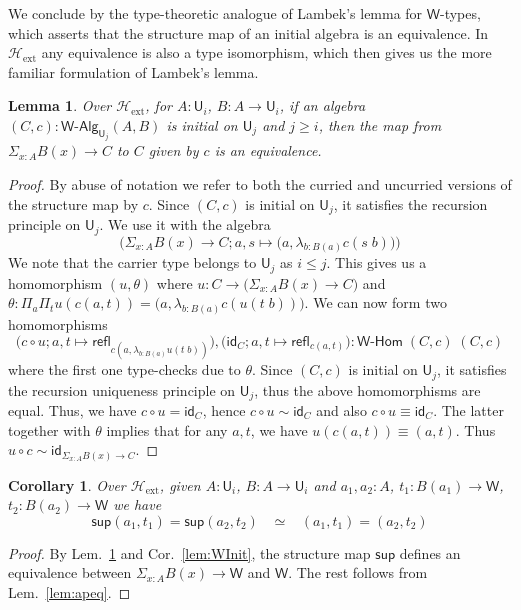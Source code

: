 \documentclass[reqno,10pt,a4paper,oneside]{amsart}
\numberwithin{equation}{section}
\theoremstyle{mythm}
\newtheorem{lemma}[theorem]{Lemma}
\newtheorem{corollary}[theorem]{Corollary}
\theoremstyle{mydef}
\theoremstyle{myrmk}
\newcommand{\idfun}[1]{\mathsf{id}_{#1}}
\newcommand{\comp}{\circ}
\newcommand{\Hext}{\mathcal{H}_{\mathrm{ext}}}
\newcommand{\prd}[1]{\Pi_{#1}}
\newcommand{\sm}[1]{\Sigma_{#1}}
\newcommand{\lam}[1]{\lambda_{#1}}
\newcommand{\refl}{\mathsf{refl}}
\newcommand{\W}{\mathsf{W}}
\newcommand{\wsup}{\mathsf{sup}}
\newcommand{\UU}{\mathsf{U}}
\newcommand{\WAlg}{\mathsf{W}\text{-}\mathsf{Alg}}
\newcommand{\WHom}{\mathsf{W}\text{-}\mathsf{Hom}}
\begin{document}
We conclude by the type-theoretic analogue of Lambek's lemma for $\W$-types, which asserts that the structure map of an initial algebra is an equivalence. In $\Hext$ any equivalence is also a type isomorphism, which then gives us the more familiar formulation of Lambek's lemma.

\begin{lemma}\label{lem:ExtLambek}
Over $\Hext$, for $A:\UU_i$, $B : A \to \UU_i$, if an algebra $(C,c) : \WAlg_{\UU_j}(A,B)$ is initial on $\UU_j$ and $j \geq i$, then the map from $\sm{x:A} B(x) \to C$ to $C$ given by $c$ is an equivalence.
\end{lemma}
\begin{proof}
By abuse of notation we refer to both the curried and uncurried versions of the structure map by $c$. Since $(C,c)$ is initial on $\UU_j$, it satisfies the recursion principle on $\UU_j$. We use it with the algebra \[\Big(\sm{x:A} B(x) \to C; a,s \mapsto \big(a,\lam{b:B(a)} c(s\;b)\big)\Big)\]
We note that the carrier type belongs to $\UU_j$ as $i \leq j$. This gives us a homomorphism $(u,\theta)$ where $u : C \to \big(\sm{x:A} B(x) \to C\big)$ and $\theta : \prd{a}\prd{t} u(c(a,t)) = \big(a,\lam{b:B(a)} c(u(t\;b))\big)$.  We can now form two homomorphisms
\[\big(c \comp u; a,t \mapsto \refl_{c(a,\lam{b:B(a)}u(t\;b))}\big), \big(\idfun{C}; a,t \mapsto \refl_{c(a,t)}\big) : \WHom \; (C,c) \; (C,c)\] where the first one type-checks due to $\theta$. Since $(C,c)$ is initial on $\UU_j$, it satisfies the recursion uniqueness principle on $\UU_j$, thus the above homomorphisms are equal. Thus, we have $c \comp u = \idfun{C}$, hence $c \comp u \sim \idfun{C}$ and also $c \comp u \equiv \idfun{C}$. The latter together with $\theta$ implies that for any $a,t$, we have $u(c(a,t)) \equiv (a,t)$. Thus $u \comp c \sim \idfun{\sm{x:A} B(x) \to C}$.
\end{proof}

\begin{corollary}
Over $\Hext$, given $A:\UU_i$, $B : A \to \UU_i$ and $a_1,a_2:A$, $t_1 : B(a_1) \to \W$, $t_2 : B(a_2) \to \W$ we have
\[ \wsup(a_1,t_1) = \wsup(a_2,t_2) \;\;\; \simeq \;\;\; (a_1,t_1) = (a_2,t_2)\]
\end{corollary}
\begin{proof}
By Lem.~\ref{lem:ExtLambek} and Cor.~\ref{lem:WInit}, the structure map $\wsup$ defines an equivalence between $\sm{x:A} B(x) \to \W$ and $\W$. The rest follows from Lem.~\ref{lem:apeq}.
\end{proof}
\end{document}
